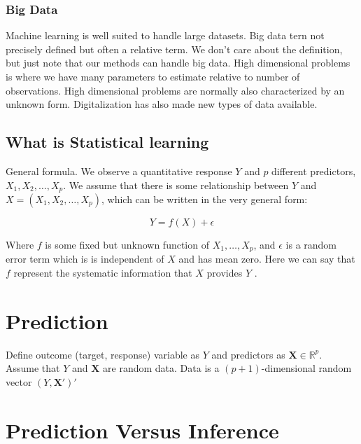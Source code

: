 \documentclass[11pt,a4paper]{article}
\begin{document}
\subsubsection{Big Data}

Machine learning is well suited to handle large datasets. Big data tern not precisely defined but often a relative term. We don't care about the definition, but just note that our methods can handle big data.
\newline
High dimensional problems is where we have many parameters to estimate relative to number of observations. High dimensional problems are normally also characterized by an unknown form. Digitalization has also made new types of data available.

\subsection{What is Statistical learning}

General formula. We observe a quantitative response \(Y\) and \(p\)
different predictors, \(X_{1}, X_{2}, \ldots, X_{p}\). We assume that there is some
relationship between \(Y\) and \(X=\left(X_{1}, X_{2}, \ldots, X_{p}\right)\), which can be written
in the very general form:

\begin{equation}
    Y=f(X)+\epsilon
\end{equation}

Where $f$ is some fixed but unknown function of $X_{1}, \ldots, X_{p}$, and $\epsilon$ is a random error term which is is independent of $X$ and has mean zero. Here we can say that $f$ represent the systematic information that $X$ provides $Y$ 
\cite{james2013introduction}.

\section{Prediction}

Define outcome (target, response) variable as $Y$ and predictors as $\mathbf{X}\in \mathbb{R}^p$.
Assume that $Y$ and $\mathbf{X}$ are random data.
Data is a $(p+1)$-dimensional random vector $(Y,\mathbf{X}')'$

\section{Prediction Versus Inference}
\end{document}
